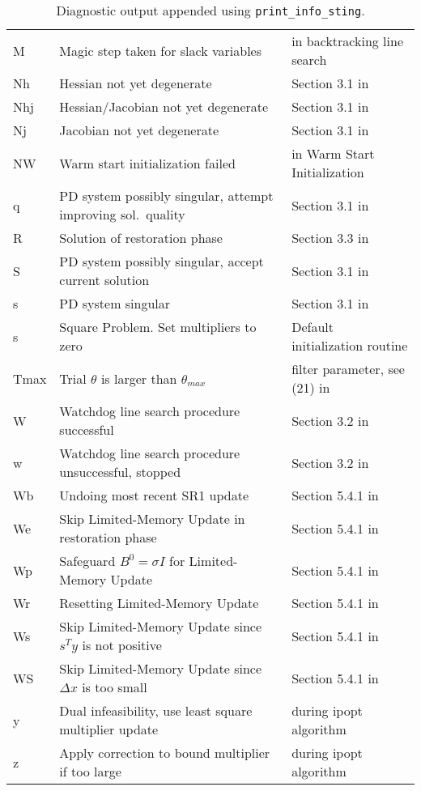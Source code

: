 \documentclass[10pt]{article}
\begin{document}
\begin{table}
\begin{tabular}{@{}lll@{}}
    M & Magic step taken for slack variables & in backtracking line search \\  
    Nh & Hessian not yet degenerate & Section 3.1 in \cite{WaecBieg06:mp}\\  
    Nhj & Hessian/Jacobian not yet degenerate & Section 3.1 in \cite{WaecBieg06:mp}\\  
    Nj & Jacobian not yet degenerate & Section 3.1 in \cite{WaecBieg06:mp}\\  
    NW & Warm start initialization failed & in Warm Start Initialization \\
    q & PD system possibly singular, attempt improving sol.\ quality & Section 3.1 in \cite{WaecBieg06:mp}\\  
    R & Solution of restoration phase & Section 3.3 in \cite{WaecBieg06:mp} \\  
    S & PD system possibly singular, accept current solution & Section 3.1 in \cite{WaecBieg06:mp}\\  
    s & PD system singular & Section 3.1 in \cite{WaecBieg06:mp}\\  
    s & Square Problem. Set multipliers to zero & Default initialization routine \\  
    Tmax & Trial $\theta$ is larger than $\theta_{max}$ & filter parameter, see (21) in \cite{WaecBieg06:mp} \\  
    W & Watchdog line search procedure successful & Section 3.2 in \cite{WaecBieg06:mp} \\  
    w & Watchdog line search procedure unsuccessful, stopped & Section 3.2 in \cite{WaecBieg06:mp} \\  
    Wb & Undoing most recent SR1 update & Section 5.4.1 in \cite{Biegler:nlpbook} \\  
    We & Skip Limited-Memory Update in restoration phase  & Section 5.4.1 in \cite{Biegler:nlpbook} \\ 
    Wp & Safeguard $B^0 = \sigma I$ for  Limited-Memory Update &  Section 5.4.1 in \cite{Biegler:nlpbook} \\  
    Wr & Resetting Limited-Memory Update &  Section 5.4.1 in \cite{Biegler:nlpbook} \\  
    Ws & Skip Limited-Memory Update since $s^Ty$ is not positive &  Section 5.4.1 in \cite{Biegler:nlpbook} \\  
    WS & Skip Limited-Memory Update since $\Delta x$ is too small &  Section 5.4.1 in \cite{Biegler:nlpbook} \\  
    y & Dual infeasibility, use least square multiplier update & during ipopt algorithm \\                           
    z & Apply correction to bound multiplier if too large & during ipopt algorithm \\
  \end{tabular}
  \caption{Diagnostic output appended using \texttt{print\_info\_sting}.}
  \label{tab:info_string}
\end{table}
\end{document}
